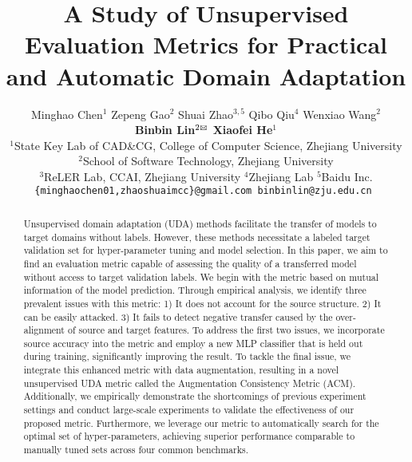 \documentclass{article} %
\begin{document}
\title{A Study of Unsupervised Evaluation Metrics for Practical and Automatic Domain Adaptation\vspace{-3mm}}

\author{
Minghao Chen$^1$\quad
Zepeng Gao$^2$\quad
Shuai Zhao$^{3,5}$\quad
Qibo Qiu$^4$\quad
Wenxiao Wang$^2$\quad \\
\textbf{Binbin Lin$^{2}\textsuperscript{\Letter}$ \quad
Xiaofei He$^1$}
\smallskip
\\
$^1$State Key Lab of CAD\&CG, College of Computer Science, Zhejiang University
\\
$^2$School of Software Technology, Zhejiang University \\
$^3$ReLER Lab, CCAI, Zhejiang University \quad
$^4$Zhejiang Lab \quad $^5$Baidu Inc.
\\
\tt\small \{minghaochen01,zhaoshuaimcc\}@gmail.com
\quad binbinlin@zju.edu.cn  
}

\maketitle

\vspace{-5mm}

\begin{abstract}
  Unsupervised domain adaptation (UDA) methods facilitate the transfer of models to target domains without labels. However, these methods necessitate a labeled target validation set for hyper-parameter tuning and model selection. In this paper, we aim to find an evaluation metric capable of assessing the quality of a transferred model without access to target validation labels. We begin with the metric based on mutual information of the model prediction. Through empirical analysis, we identify three prevalent issues with this metric: 1) It does not account for the source structure. 2) It can be easily attacked. 3) It fails to detect negative transfer caused by the over-alignment of source and target features. To address the first two issues, we incorporate source accuracy into the metric and employ a new MLP classifier that is held out during training, significantly improving the result. To tackle the final issue, we integrate this enhanced metric with data augmentation, resulting in a novel unsupervised UDA metric called the Augmentation Consistency Metric (ACM). Additionally, we empirically demonstrate the shortcomings of previous experiment settings and conduct large-scale experiments to validate the effectiveness of our proposed metric. Furthermore, we leverage our metric to automatically search for the optimal set of hyper-parameters, achieving superior performance comparable to manually tuned sets across four common benchmarks.
\end{abstract}
\vspace{-2mm}
\end{document}
